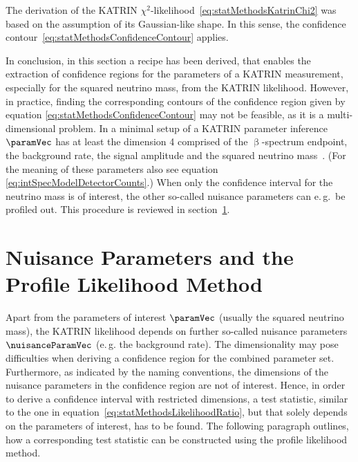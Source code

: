 The derivation of the KATRIN $\chi^2$-likelihood~\eqref{eq:statMethodsKatrinChi2} was based on the assumption of its Gaussian-like shape. In this sense, the confidence contour~\eqref{eq:statMethodsConfidenceContour} applies. 

In conclusion, in this section a recipe has been derived, that enables the extraction of confidence regions for the parameters of a KATRIN measurement, especially for the squared neutrino mass, from the KATRIN likelihood. However, in practice, finding the corresponding contours of the confidence region given by equation \ref{eq:statMethodsConfidenceContour} may not be feasible, as it is a multi-dimensional problem. In a minimal setup of a KATRIN parameter inference $\paramVec$ has at least the dimension 4 comprised of the $\upbeta$-spectrum endpoint, the background rate, the signal amplitude and the squared neutrino mass~\cite{Kleesiek2014}. (For the meaning of these parameters also see equation \eqref{eq:intSpecModelDetectorCounts}.) When only the confidence interval for the neutrino mass is of interest, the other so-called nuisance parameters can e.\,g.~be profiled out. This procedure is reviewed in section~\ref{sec:statMethodsProfileLikelihood}.

\section{Nuisance Parameters and the Profile Likelihood Method}
\label{sec:statMethodsProfileLikelihood}
Apart from the  parameters of interest $\paramVec$ (usually the squared neutrino mass), the KATRIN likelihood depends on further so-called nuisance parameters $\nuisanceParamVec$ (e.\,g. the background rate). The dimensionality may pose difficulties when deriving a confidence region for the combined parameter set. Furthermore, as indicated by the naming conventions, the dimensions of the nuisance parameters in the confidence region are not of interest. Hence, in order to derive a confidence interval with restricted dimensions, a test statistic, similar to the one in equation~\ref{eq:statMethodsLikelihoodRatio}, but that solely depends on the parameters of interest, has to be found. The following paragraph outlines, how a corresponding test statistic can be constructed using the profile likelihood method.

